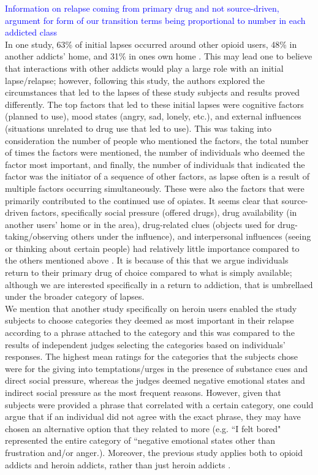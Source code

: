 \documentclass[12pt]{article}
\begin{document}
\textcolor{blue}{Information on relapse coming from primary drug and not source-driven, argument for form of our transition terms being proportional to number in each addicted class} \\
In one study, 63\% of initial lapses occurred around other opioid users, 48\% in another addicts' home, and 31\% in ones own home \cite{Gossop1}. This may lead one to believe that interactions with other addicts would play a large role with an initial lapse/relapse; however, following this study, the authors explored the circumstances that led to the lapses of these study subjects and results proved differently. The top factors that led to these initial lapses were cognitive factors (planned to use), mood states (angry, sad, lonely, etc.), and external influences (situations unrelated to drug use that led to use). This was taking into consideration the number of people who mentioned the factors, the total number of times the factors were mentioned, the number of individuals who deemed the factor most important, and finally, the number of individuals that indicated the factor was the initiator of a sequence of other factors, as lapse often is a result of multiple factors occurring simultaneously. These were also the factors that were primarily contributed to the continued use of opiates. It seems clear that source-driven factors, specifically social pressure (offered drugs), drug availability (in another users' home or in the area), drug-related clues (objects used for drug-taking/observing others under the influence), and interpersonal influences (seeing or thinking about certain people) had relatively little importance compared to the others mentioned above \cite{Gossop2}. It is because of this that we argue individuals return to their primary drug of choice compared to what is simply available; although we are interested specifically in a return to addiction, that is umbrellaed under the broader category of lapses. \\
We mention that another study specifically on heroin users enabled the study subjects to choose categories they deemed as most important in their relapse according to a phrase attached to the category and this was compared to the results of independent judges selecting the categories based on individuals' responses. The highest mean ratings for the categories that the subjects chose were for the giving into temptations/urges in the presence of substance cues and direct social pressure, whereas the judges deemed negative emotional states and indirect social pressure as the most frequent reasons. However, given that subjects were provided a phrase that correlated with a certain category, one could argue that if an individual did not agree with the exact phrase, they may have chosen an alternative option that they related to more (e.g. ``I felt bored" represented the entire category of ``negative emotional states other than frustration and/or anger.). Moreover, the previous study applies both to opioid addicts and heroin addicts, rather than just heroin addicts \cite{Heather}.
\end{document}
